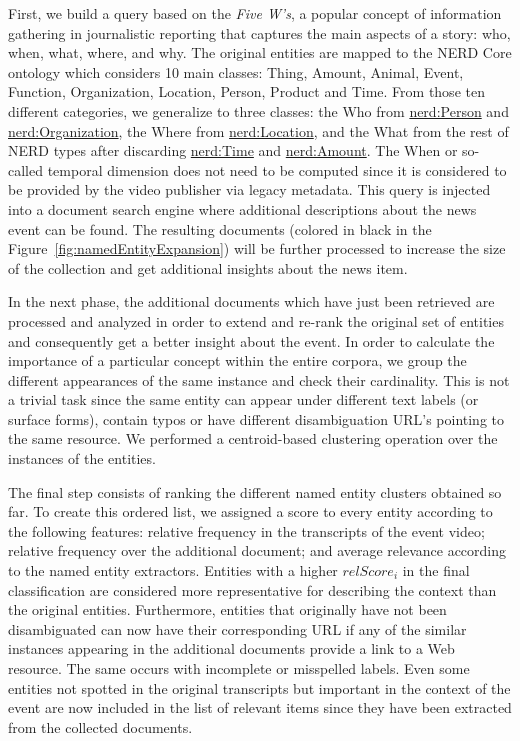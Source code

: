 \documentclass[a4paper,11pt]{report}
\begin{document}
First, we build a query based on the \emph{Five W's}, a popular concept of information gathering in journalistic reporting that captures the main aspects of a story: who, when, what, where, and why. The original entities are mapped to the NERD Core ontology which considers 10 main classes: Thing, Amount, Animal, Event, Function, Organization, Location, Person, Product and Time. From those ten different categories, we generalize to three classes: the Who from \url{nerd:Person} and \url{nerd:Organization}, the Where from \url{nerd:Location}, and the What from the rest of NERD types after discarding \url{nerd:Time} and \url{nerd:Amount}. The When or so-called temporal dimension does not need to be computed since it is considered to be provided by the video publisher via legacy metadata. This query is injected into a document search engine where additional descriptions about the news event can be found. The resulting documents (colored in black in the Figure~\ref{fig:namedEntityExpansion}) will be further processed to increase the size of the collection and get additional insights about the news item.

In the next phase, the additional documents which have just been retrieved are processed and analyzed in order to extend and re-rank the original set of entities and consequently get a better insight about the event. In order to calculate the importance of a particular concept within the entire corpora, we group the different appearances of the same instance and check their cardinality. This is not a trivial task since the same entity can appear under different text labels (or surface forms), contain typos or have different disambiguation URL's pointing to the same resource. We performed a centroid-based clustering operation over the instances of the entities.

The final step consists of ranking the different named entity clusters obtained so far. To create this ordered list, we assigned a score to every entity according to the following features: relative frequency in the transcripts of the event video; relative frequency over the additional document; and average relevance according to the named entity extractors. Entities with a higher $relScore_{i}$ in the final classification are considered more representative for describing the context than the original entities. Furthermore, entities that originally have not been disambiguated can now have their corresponding URL if any of the similar instances appearing in the additional documents provide a link to a Web resource. The same occurs with incomplete or misspelled labels. Even some entities not spotted in the original transcripts but important in the context of the event are now included in the list of relevant items since they have been extracted from the collected documents.
\end{document}
